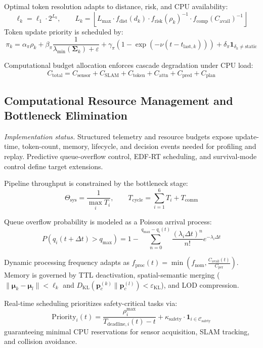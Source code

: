 Optimal token resolution adapts to distance, risk, and CPU availability:
\begin{equation}
  \ell_k = \ell_1 \cdot 2^{L_k}, \qquad L_k = \left\lfloor L_{\max} \cdot f_{\text{dist}}(d_k) \cdot f_{\text{risk}}(\rho_k)^{-1} \cdot f_{\text{comp}}(C_{\text{avail}})^{-1} \right\rfloor
\end{equation}
Token update priority is scheduled by:
\begin{equation}
  \pi_k = \alpha_\pi \rho_k + \beta_\pi \frac{1}{\lambda_{\min}(\mathbf{\Sigma}_k) + \varepsilon} + \gamma_\pi (1 - \exp(-\nu(t - t_{\text{last},k}))) + \delta_\pi \mathbf{1}_{\delta_k \ne \text{static}}
\end{equation}

Computational budget allocation enforces cascade degradation under CPU load:
\begin{equation}
  C_{\text{total}} = C_{\text{sensor}} + C_{\text{SLAM}} + C_{\text{token}} + C_{\text{attn}} + C_{\text{pred}} + C_{\text{plan}}
\end{equation}

\subsection{Computational Resource Management and Bottleneck Elimination}
\label{subsec:resource_management}

\emph{Implementation status.} Structured telemetry and resource budgets expose update-time, token-count, memory, lifecycle, and decision events needed for profiling and replay. Predictive queue-overflow control, EDF-RT scheduling, and survival-mode control define target extensions.

Pipeline throughput is constrained by the bottleneck stage:
\begin{equation}
  \Theta_{\text{sys}} = \frac{1}{\max_i T_i}, \qquad T_{\text{cycle}} = \sum_{i=1}^6 T_i + T_{\text{comm}}
\end{equation}

Queue overflow probability is modeled as a Poisson arrival process:
\begin{equation}
  P(q_i(t+\Delta t) > q_{\max}) = 1 - \sum_{n=0}^{q_{\max}-q_i(t)} \frac{(\lambda_i \Delta t)^n}{n!} e^{-\lambda_i \Delta t}
\end{equation}

Dynamic processing frequency adapts as $f_{\text{proc}}(t) = \min(f_{\text{nom}}, \frac{C_{\text{avail}}(t)}{C_{\text{per}}})$. Memory is governed by TTL deactivation, spatial-semantic merging ($\|\boldsymbol{\mu}_k - \boldsymbol{\mu}_l\| < \ell_k$ and $D_{\text{KL}}(\mathbf{p}_c^{(k)} \| \mathbf{p}_c^{(l)}) < \varepsilon_{\text{KL}}$), and LOD compression.

Real-time scheduling prioritizes safety-critical tasks via:
\begin{equation}
  \mathrm{Priority}_i(t) = \frac{\rho_i^{\max}}{T_{\text{deadline},i}(t) - t} + \kappa_{\text{safety}} \cdot \mathbf{1}_{i \in \mathcal{C}_{\text{safety}}}
\end{equation}
guaranteeing minimal CPU reservations for sensor acquisition, SLAM tracking, and collision avoidance.
